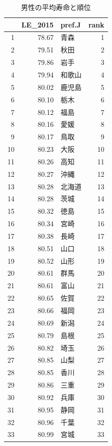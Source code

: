\begin{table}[ht]
\caption{男性の平均寿命と順位}
\centering
\footnotesize
\begin{tabular}{rrlr}
  \hline
 & LE\_2015 & pref.J & rank \\ 
  \hline
1 & 78.67 & 青森 &   1 \\ 
  2 & 79.51 & 秋田 &   2 \\ 
  3 & 79.86 & 岩手 &   3 \\ 
  4 & 79.94 & 和歌山 &   4 \\ 
  5 & 80.02 & 鹿児島 &   5 \\ 
  6 & 80.10 & 栃木 &   6 \\ 
  7 & 80.12 & 福島 &   7 \\ 
  8 & 80.16 & 愛媛 &   8 \\ 
  9 & 80.17 & 鳥取 &   9 \\ 
  10 & 80.23 & 大阪 &  10 \\ 
  11 & 80.26 & 高知 &  11 \\ 
  12 & 80.27 & 沖縄 &  12 \\ 
  13 & 80.28 & 北海道 &  13 \\ 
  14 & 80.28 & 茨城 &  14 \\ 
  15 & 80.32 & 徳島 &  15 \\ 
  16 & 80.34 & 宮崎 &  16 \\ 
  17 & 80.38 & 長崎 &  17 \\ 
  18 & 80.51 & 山口 &  18 \\ 
  19 & 80.52 & 山形 &  19 \\ 
  20 & 80.61 & 群馬 &  20 \\ 
  21 & 80.61 & 富山 &  21 \\ 
  22 & 80.65 & 佐賀 &  22 \\ 
  23 & 80.66 & 福岡 &  23 \\ 
  24 & 80.69 & 新潟 &  24 \\ 
  25 & 80.79 & 島根 &  25 \\ 
  26 & 80.82 & 埼玉 &  26 \\ 
  27 & 80.85 & 山梨 &  27 \\ 
  28 & 80.85 & 香川 &  28 \\ 
  29 & 80.86 & 三重 &  29 \\ 
  30 & 80.92 & 兵庫 &  30 \\ 
  31 & 80.95 & 静岡 &  31 \\ 
  32 & 80.96 & 千葉 &  32 \\ 
  33 & 80.99 & 宮城 &  33 \\ 

\end{tabular}
\end{table}
